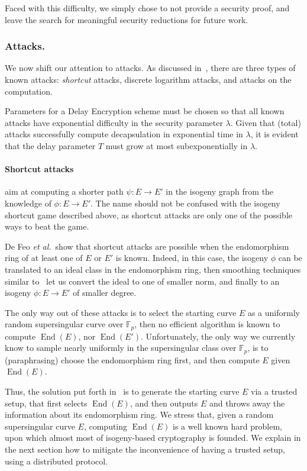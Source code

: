 \documentclass{llncs}
\newcommand{\F}{\mathbb{F}}
\DeclareMathOperator{\End}{End}
\begin{document}
Faced with this difficulty, we simply chose to not provide a security
proof, and leave the search for meaningful security reductions for
future work.

\subsubsection{Attacks.} We now shift our attention to attacks. %
As discussed in~\cite{10.1007/978-3-030-34578-5_10}, there are three
types of known attacks: \emph{shortcut} attacks, discrete logarithm
attacks, and attacks on the computation.

Parameters for a Delay Encryption scheme must be chosen so that all
known attacks have exponential difficulty in the security parameter
$\lambda$. %
Given that (total) attacks successfully compute decapsulation in
exponential time in $\lambda$, it is evident that the delay parameter
$T$ must grow at most subexponentially in $\lambda$.

\paragraph{Shortcut attacks} aim at computing a shorter path
$\psi:E\to E'$ in the isogeny graph from the knowledge of
$\phi:E\to E'$. %
The name should not be confused with the isogeny shortcut game
described above, as shortcut attacks are only one of the possible ways
to beat the game.

De Feo \emph{et al.}\ show that shortcut attacks are possible when the
endomorphism ring of at least one of $E$ or $E'$ is known. %
Indeed, in this case, the isogeny $\phi$ can be translated to an ideal
class in the endomorphism ring, then smoothing techniques similar
to~\cite{kohel2014quaternion} let us convert the ideal to one of
smaller norm, and finally to an isogeny $\phi:E\to E'$ of smaller
degree.

The only way out of these attacks is to select the starting curve $E$
as a uniformly random supersingular curve over $\F_p$, then no
efficient algorithm is known to compute $\End(E)$, nor $\End(E')$. %
Unfortunately, the only way we currently know to sample nearly
uniformly in the supersingular class over $\F_p$, is to
(paraphrasing) choose the endomorphism ring first, and then compute
$E$ given $\End(E)$.

Thus, the solution put forth in~\cite{10.1007/978-3-030-34578-5_10} is
to generate the starting curve $E$ via a trusted setup, that first
selects $\End(E)$, and then outputs $E$ and throws away the
information about its endomorphism ring. %
We stress that, given a random supersingular curve $E$, computing
$\End(E)$ is a well known hard problem, upon which almost most of
isogeny-based cryptography is founded. %
We explain in the next section how to mitigate the inconvenience of
having a trusted setup, using a distributed protocol.
\end{document}

